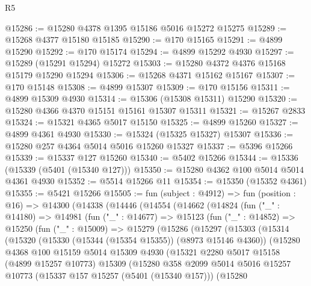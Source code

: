 \begin{lexlean}{R5}
\begin{coremodule}
@15286 := @15280 @4378 @1395 @15186 @5016 @15272 @15275
@15289 := @15268 @4377 @15180 @15185
@15290 := @170 @15165
@15291 := @4899 @15290
@15292 := @170 @15174
@15294 := @4899 @15292 @4930
@15297 := @15289 (@15291 @15294) @15272
@15303 := @15280 @4372 @4376 @15168 @15179 @15290 @15294
@15306 := @15268 @4371 @15162 @15167
@15307 := @170 @15148
@15308 := @4899 @15307
@15309 := @170 @15156
@15311 := @4899 @15309 @4930
@15314 := @15306 (@15308 @15311) @15290
@15320 := @15280 @4366 @4370 @15151 @15161 @15307 @15311
@15321 := @15267 @2833
@15324 := @15321 @4365 @5017 @15150
@15325 := @4899 @15260
@15327 := @4899 @4361 @4930
@15330 := @15324 (@15325 @15327) @15307
@15336 := @15280 @257 @4364 @5014 @5016 @15260 @15327
@15337 := @5396 @15266
@15339 := @15337 @127 @15260
@15340 := @5402 @15266
@15344 := @15336 (@15339 (@5401 (@15340 @127)))
@15350 := @15280 @4362 @100 @5014 @5014 @4361 @4930
@15352 := @5514 @15266 @11
@15354 := @15350 (@15352 @4361)
@15355 := @5421 @15266
@15505 := fun (subject : @4912) =>
  fun (position : @16) =>
  @14300
    (@14338
      (@14446
        (@14554
          (@14662
            (@14824
              (fun ("_" : @14180) =>
              @14981
                (fun ("_" : @14677) =>
                @15123
                  (fun ("_" : @14852) =>
                  @15250
                    (fun ("_" : @15009) =>
                    @15279
                      (@15286
                        (@15297
                          (@15303
                            (@15314
                              (@15320
                                (@15330 (@15344 (@15354 @15355)) (@8973 @15146 @4360))
                                (@15280
                                  @4368
                                  @100
                                  @15159
                                  @5014
                                  @15309
                                  @4930
                                  (@15321
                                    @2280
                                    @5017
                                    @15158
                                    (@4899 @15257 @10773)
                                    @15309
                                    (@15280
                                      @358
                                      @2099
                                      @5014
                                      @5016
                                      @15257
                                      @10773
                                      (@15337 @157 @15257 (@5401 (@15340 @157)))
                                      (@15280

\end{coremodule}
\end{lexlean}

